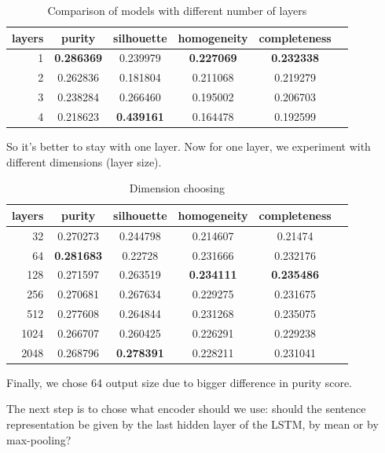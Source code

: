 \documentclass[11pt]{article}
\begin{document}
\begin{table}[htb]
\begin{center}
\begin{tabular}{ |r|c|c|c|c|c| }
\hline
layers & purity  & silhouette  & homogeneity  & completeness \\ \hline 
1  & \textbf{0.286369}  & 0.239979  & \textbf{0.227069}  & \textbf{0.232338}\\ \hline 
2  & 0.262836  & 0.181804  & 0.211068  & 0.219279\\ \hline 
3  & 0.238284  & 0.266460  & 0.195002  & 0.206703\\ \hline 
4  & 0.218623  & \textbf{0.439161}  & 0.164478  & 0.192599\\ \hline 
\end{tabular}
\end{center}
\caption{Comparison of models with different number of layers}
\end{table}
\FloatBarrier

So it's better to stay with one layer. Now for one layer, we experiment with different dimensions (layer size).

\begin{table}[htb]
\begin{center}
\begin{tabular}{ |r|c|c|c|c|c| }
\hline
layers & purity  & silhouette  & homogeneity  & completeness \\ \hline 
32  & 0.270273  & 0.244798  & 0.214607  & 0.21474\\ \hline 
64  & \textbf{0.281683}  & 0.22728  & 0.231666  & 0.232176\\ \hline 
128  & 0.271597  & 0.263519  & \textbf{0.234111}  & \textbf{0.235486}\\ \hline 
256  & 0.270681  & 0.267634  & 0.229275  & 0.231675\\ \hline 
512  & 0.277608  & 0.264844  & 0.231268  & 0.235075\\ \hline 
1024  & 0.266707  & 0.260425  & 0.226291  & 0.229238\\ \hline 
2048  & 0.268796  & \textbf{0.278391}  & 0.228211  & 0.231041 \\ \hline
\end{tabular}
\end{center}
\caption{Dimension choosing}
\end{table}
\FloatBarrier

Finally, we chose 64 output size due to bigger difference in purity score.

The next step is to chose what encoder should we use: should the sentence representation be given by the last hidden layer of the LSTM, by mean or by max-pooling?
\end{document}
